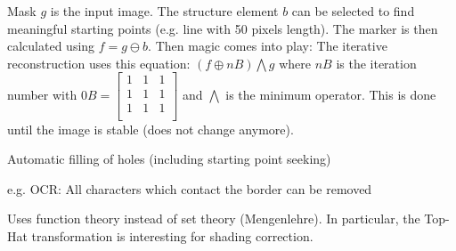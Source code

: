   
      Mask $g$ is the input image. The structure element $b$ can be selected to find meaningful starting 
      points (e.g. line with 50 pixels length).
      The marker is then calculated using $f = g \ominus b$.
      Then magic comes into play: The iterative reconstruction uses this equation: $(f \oplus nB) \bigwedge g$
      where $nB$ is the iteration number with 
      $0B = \begin{bmatrix}
      1&1&1\\
      1&1&1\\
      1&1&1\\
      \end{bmatrix}$
      and $\bigwedge$ is the minimum operator.
      This is done until the image is stable (does not change anymore).
      
     Automatic filling of holes (including starting point seeking)
    
     e.g. OCR: All characters which contact the border can be 
    removed
  
    Uses function theory instead of set theory (Mengenlehre).
    In particular, the Top-Hat transformation  is interesting for shading 
    correction.